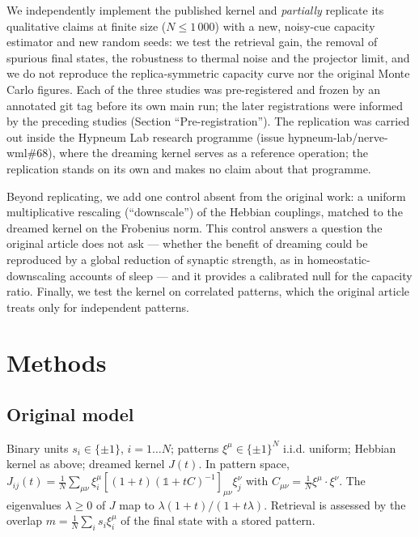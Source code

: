 We independently implement the published kernel and \emph{partially}
replicate its qualitative claims at finite size (\(N \le 1\,000\)) with
a new, noisy-cue capacity estimator and new random seeds: we test the
retrieval gain, the removal of spurious final states, the robustness to
thermal noise and the projector limit, and we do not reproduce the
replica-symmetric capacity curve nor the original Monte Carlo figures.
Each of the three studies was pre-registered and frozen by an annotated
git tag before its own main run; the later registrations were informed
by the preceding studies (Section ``Pre-registration''). The replication
was carried out inside the Hypneum Lab research programme (issue
hypneum-lab/nerve-wml\#68), where the dreaming kernel serves as a
reference operation; the replication stands on its own and makes no
claim about that programme.

Beyond replicating, we add one control absent from the original work: a
uniform multiplicative rescaling (``downscale'') of the Hebbian
couplings, matched to the dreamed kernel on the Frobenius norm. This
control answers a question the original article does not ask --- whether
the benefit of dreaming could be reproduced by a global reduction of
synaptic strength, as in homeostatic-downscaling accounts of sleep
\supercite{tononi2014shy} --- and it provides a calibrated null for the
capacity ratio. Finally, we test the kernel on correlated patterns,
which the original article treats only for independent patterns.

\section{Methods}\label{methods}

\subsection{Original model}\label{original-model}

Binary units \(s_i \in \{\pm1\}\), \(i = 1 \dots N\); patterns
\(\xi^\mu \in \{\pm1\}^N\) i.i.d. uniform; Hebbian kernel as above;
dreamed kernel \(J(t)\). In pattern space,
\(J_{ij}(t) = \frac1N\sum_{\mu\nu}\xi_i^\mu
[(1+t)(\mathbb 1 + tC)^{-1}]_{\mu\nu}\xi_j^\nu\) with
\(C_{\mu\nu} = \frac1N\xi^\mu\!\cdot\xi^\nu\). The eigenvalues
\(\lambda \ge 0\) of \(J\) map to \(\lambda(1+t)/(1+t\lambda)\).
Retrieval is assessed by the overlap \(m = \frac1N\sum_i s_i\xi_i^\mu\)
of the final state with a stored pattern.

